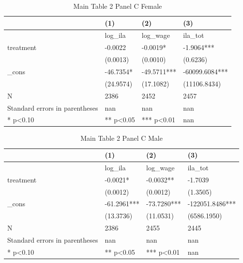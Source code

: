 \documentclass[11pt]{article}
\begin{document}
\clearpage
\begin{table}[!htbp]
\centering
\caption{Main Table 2 Panel C Female}
\label{tab:table2c_f}
\begin{tabular}{llll}
\toprule
 & (1) & (2) & (3) \\
\midrule
 & log\_ila & log\_wage & ila\_tot \\
treatment & -0.0022 & -0.0019* & -1.9064*** \\
 & (0.0013) & (0.0010) & (0.6236) \\
\_cons & -46.7354* & -49.5711*** & -60099.6084*** \\
 & (24.9574) & (17.1082) & (11106.8434) \\
N & 2386 & 2452 & 2457 \\
Standard errors in parentheses & nan & nan & nan \\
* p<0.10 & ** p<0.05 & *** p<0.01 & nan \\
\bottomrule
\end{tabular}

\end{table}

\clearpage
\begin{table}[!htbp]
\centering
\caption{Main Table 2 Panel C Male}
\label{tab:table2c_m}
\begin{tabular}{llll}
\toprule
 & (1) & (2) & (3) \\
\midrule
 & log\_ila & log\_wage & ila\_tot \\
treatment & -0.0021* & -0.0032** & -1.7039 \\
 & (0.0012) & (0.0012) & (1.3505) \\
\_cons & -61.2961*** & -73.7280*** & -122051.8486*** \\
 & (13.3736) & (11.0531) & (6586.1950) \\
N & 2386 & 2455 & 2445 \\
Standard errors in parentheses & nan & nan & nan \\
* p<0.10 & ** p<0.05 & *** p<0.01 & nan \\
\bottomrule
\end{tabular}

\end{table}
\end{document}
